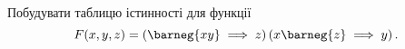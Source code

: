 %
%
^^I^^IПобудувати таблицю істинності для функції
^^I^^I\[
^^I^^I^^IF(x, y, z) = \left( \barneg{xy} \implies z\right) \left( x \barneg{z} \implies y \right).
^^I^^I\]
